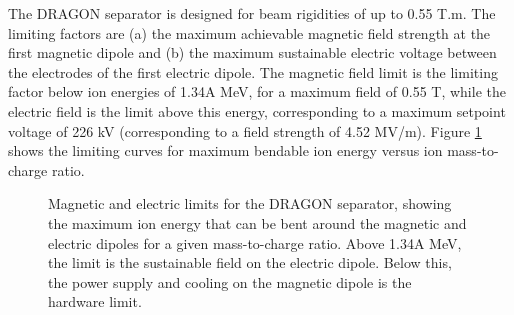 The DRAGON separator is designed for beam rigidities of up to 0.55 T.m. The limiting factors are (a) the maximum achievable magnetic field strength at the first magnetic dipole and (b) the maximum sustainable electric voltage between the electrodes of the first electric dipole. The magnetic field limit is the limiting factor below ion energies of 1.34A MeV, for a maximum field of 0.55 T, while the electric field is the limit above this energy, corresponding to a maximum setpoint voltage of 226 kV (corresponding to a field strength of 4.52 MV/m). Figure \ref{fig:rigidity} shows the limiting curves for maximum bendable ion energy versus ion mass-to-charge ratio.   

\begin{figure}
\caption{Magnetic and electric limits for the DRAGON separator, showing the maximum ion energy that can be bent around the magnetic and electric dipoles for a given mass-to-charge ratio. Above 1.34A MeV, the limit is the sustainable field on the electric dipole. Below this, the power supply and cooling on the magnetic dipole is the hardware limit.}
\label{fig:rigidity}
\end{figure}

